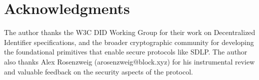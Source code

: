 \documentclass[conference]{IEEEtran}
\begin{document}
\section*{Acknowledgments}

The author thanks the W3C DID Working Group for their work on Decentralized Identifier specifications, and the broader cryptographic community for developing the foundational primitives that enable secure protocols like SDLP. The author also thanks Alex Rosenzweig (arosenzweig@block.xyz) for his instrumental review and valuable feedback on the security aspects of the protocol.



\end{document}
